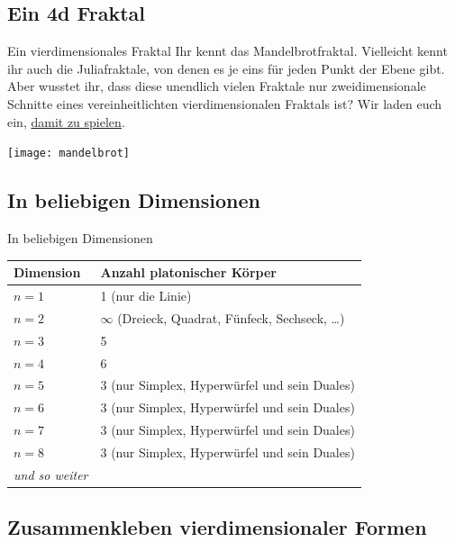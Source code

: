\documentclass[12pt,compress,ngerman,utf8,t]{beamer}
\begin{document}
\subsection{Ein 4d Fraktal}

\begin{frame}{Ein vierdimensionales Fraktal}
  \justifying
  Ihr kennt das Mandelbrotfraktal.
  Vielleicht kennt ihr auch die Juliafraktale, von denen es je eins für jeden
  Punkt der Ebene gibt.
  Aber wusstet ihr, dass diese unendlich vielen Fraktale nur zweidimensionale
  Schnitte eines vereinheitlichten vierdimensionalen Fraktals ist?
  Wir laden euch ein,
  \href{https://rawgit.com/MatthiasHu/FractalsWebGL/4d/page.html}{damit zu spielen}.
  \bigskip

  \centering
  \texttt{[image: mandelbrot]}
  \par
\end{frame}


\subsection{In beliebigen Dimensionen}

\begin{frame}{In beliebigen Dimensionen}
  \centering
  \begin{tabular}{ll}
    \toprule
    Dimension & Anzahl platonischer Körper \\ \midrule
    $n = 1$ & 1 (nur die Linie) \\
    $n = 2$ & $\infty$ (Dreieck, Quadrat, Fünfeck, Sechseck, \ldots) \\
    $n = 3$ & 5 \\
    $n = 4$ & 6 \\
    $n = 5$ & 3 (nur Simplex, Hyperwürfel und sein Duales) \\
    $n = 6$ & 3 (nur Simplex, Hyperwürfel und sein Duales) \\
    $n = 7$ & 3 (nur Simplex, Hyperwürfel und sein Duales) \\
    $n = 8$ & 3 (nur Simplex, Hyperwürfel und sein Duales) \\
    \emph{und so weiter} \\
    \bottomrule
  \end{tabular}
  \par
\end{frame}


\subsection[Verkleben]{Zusammenkleben vierdimensionaler Formen}
\end{document}

